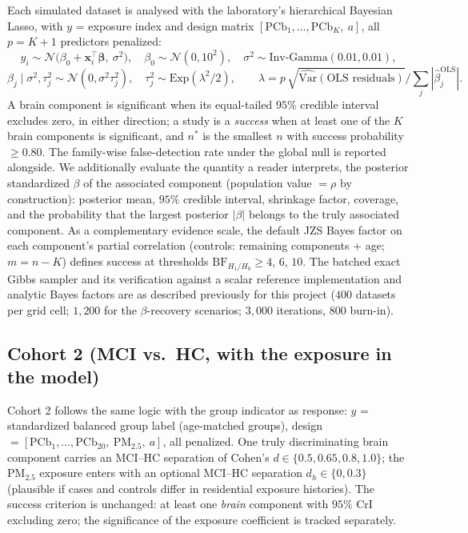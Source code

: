 \documentclass[11pt,a4paper]{article}
\newcommand{\BF}{\mathrm{BF}}
\newcommand{\pmf}{PM$_{2.5}$}
\begin{document}
Each simulated dataset is analysed with the laboratory's hierarchical Bayesian Lasso, with $y$ = exposure index and design matrix $[\mathrm{PCb}_{1},\dots,\mathrm{PCb}_{K},\ a]$, all $p=K{+}1$ predictors penalized:
\begin{equation}
y_i \sim \mathcal{N}\!\bigl(\beta_0 + \mathbf{x}_i^{\top}\boldsymbol\beta,\ \sigma^2\bigr),\quad
\beta_0\sim\mathcal{N}(0,10^2),\quad \sigma^2\sim\text{Inv-Gamma}(0.01,0.01),
\end{equation}
\begin{equation}
\beta_j\mid\sigma^2,\tau_j^2 \sim \mathcal{N}(0,\sigma^2\tau_j^2),\quad
\tau_j^2\sim\text{Exp}(\lambda^2/2),
\qquad
\lambda = p\,\sqrt{\widehat{\mathrm{Var}}(\text{OLS residuals})}\Big/\sum_j|\hat\beta_j^{\mathrm{OLS}}| .
\end{equation}
A brain component is significant when its equal-tailed $95\%$ credible interval excludes zero, in either direction; a study is a \emph{success} when at least one of the $K$ brain components is significant, and $n^{*}$ is the smallest $n$ with success probability $\ge0.80$. The family-wise false-detection rate under the global null is reported alongside. We additionally evaluate the quantity a reader interprets, the posterior standardized $\beta$ of the associated component (population value $=\rho$ by construction): posterior mean, $95\%$ credible interval, shrinkage factor, coverage, and the probability that the largest posterior $|\beta|$ belongs to the truly associated component. As a complementary evidence scale, the default JZS Bayes factor on each component's partial correlation (controls: remaining components + age; $m=n-K$) defines success at thresholds $\BF_{H_1/H_0}\ge4$, $6$, $10$. The batched exact Gibbs sampler and its verification against a scalar reference implementation and analytic Bayes factors are as described previously for this project ($400$ datasets per grid cell; $1{,}200$ for the $\beta$-recovery scenarios; $3{,}000$ iterations, $800$ burn-in).

\subsection{Cohort 2 (MCI vs.\ HC, with the exposure in the model)}

Cohort 2 follows the same logic with the group indicator as response: $y$ = standardized balanced group label (age-matched groups), design $=[\mathrm{PCb}_{1},\dots,\mathrm{PCb}_{20},\ \mathrm{PM}_{2.5},\ a]$, all penalized. One truly discriminating brain component carries an MCI--HC separation of Cohen's $d\in\{0.5,0.65,0.8,1.0\}$; the \pmf{} exposure enters with an optional MCI--HC separation $d_h\in\{0,0.3\}$ (plausible if cases and controls differ in residential exposure histories). The success criterion is unchanged: at least one \emph{brain} component with $95\%$ CrI excluding zero; the significance of the exposure coefficient is tracked separately.
\end{document}
